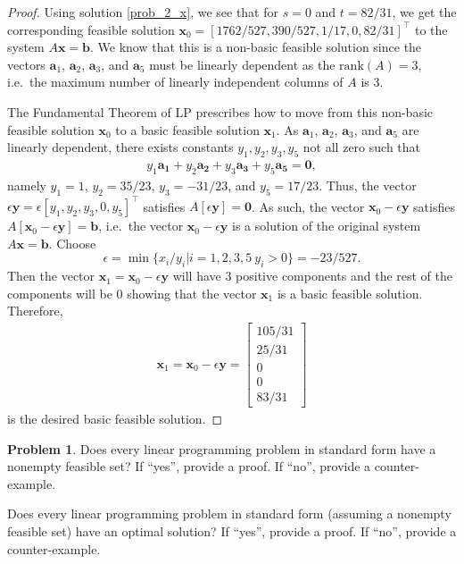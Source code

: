 \documentclass[12pt]{article}
\theoremstyle{definition}
\newtheorem{problem}{Problem}
\newcommand{\vect}[1]{\boldsymbol{#1}}
\begin{document}
\begin{proof}
  Using solution \eqref{prob_2_x}, we see that for $s = 0$ and $t = 82/31$, we get
  the corresponding feasible solution $\vect{x}_0 = [1762/527, 390/527, 1/17, 0, 82/31]^\intercal$ to the system
  $A\vect{x} = \vect{b}$. We know that this is a non-basic feasible solution since the vectors
  $\vect{a}_1$, $\vect{a}_2$, $\vect{a}_3$, and $\vect{a}_5$ must be linearly
  dependent as the $\text{rank}(A) = 3$, i.e.\ the maximum number of linearly independent columns of $A$ is 3.

  The Fundamental Theorem of LP prescribes how to move from this non-basic feasible
  solution $\vect{x}_0$ to a basic feasible solution $\vect{x}_1$. As $\vect{a}_1$, $\vect{a}_2$, $\vect{a}_3$, and $\vect{a}_5$
  are linearly dependent, there exists constants $y_1, y_2, y_3, y_5$ not all zero such that
  \begin{align*}
    y_1\vect{a_1} + y_2\vect{a_2} + y_3\vect{a_3} + y_5\vect{a_5} = \vect{0},
  \end{align*}
  namely $y_1 = 1$, $y_2 = 35/23$, $y_3 = -31/23$, and $y_5 = 17/23$.
  Thus, the vector $\epsilon\vect{y} = \epsilon[y_1, y_2, y_3, 0, y_5] ^ \intercal$ satisfies
  $A[\epsilon\vect{y}] = \vect{0}$. As such, the vector $\vect{x}_0 - \epsilon\vect{y}$ satisfies
  $A[\vect{x}_0 - \epsilon\vect{y}] = \vect{b}$, i.e.\ the vector $\vect{x}_0 - \epsilon\vect{y}$
  is a solution of the original system $A\vect{x} = \vect{b}$. Choose
  $$\epsilon = \min\{x_i/y_i| i=1,2,3,5\ y_i > 0\} = -23/527.$$
  Then the vector $\vect{x}_1 = \vect{x}_0 - \epsilon\vect{y}$ will have 3 positive components and the rest of the components will be 0 showing that
  the vector $\vect{x}_1$ is a basic feasible solution. Therefore,
  \begin{align*}
    \vect{x}_1 = \vect{x}_0 - \epsilon\vect{y} = \begin{bmatrix}105/31\\ 25/31\\ 0\\ 0\\ 83/31\end{bmatrix}
  \end{align*}
  is the desired basic feasible solution.
\end{proof}
\newpage


\begin{problem}
  Does every linear programming problem in standard form have a nonempty feasible set?
  If ``yes'', provide a proof. If ``no'', provide a counter-example.

  Does every linear programming problem in standard form (assuming a nonempty feasible
  set) have an optimal solution? If ``yes'', provide a proof. If ``no'', provide a counter-example.
\end{problem}
\end{document}
